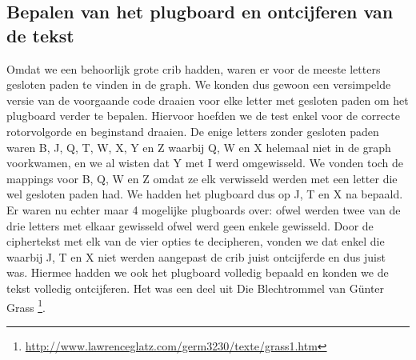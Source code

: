 \subsection{Bepalen van het plugboard en ontcijferen van de tekst}
Omdat we een behoorlijk grote crib hadden, waren er voor de meeste letters gesloten paden te vinden in de graph. We konden dus gewoon een versimpelde versie van de voorgaande code draaien voor elke letter met gesloten paden om het plugboard verder te bepalen. Hiervoor hoefden we de test enkel voor de correcte rotorvolgorde en beginstand draaien. De enige letters zonder gesloten paden waren B, J, Q, T, W, X, Y en Z waarbij Q, W en X helemaal niet in de graph voorkwamen, en we al wisten dat Y met I werd omgewisseld. We vonden toch de mappings voor B, Q, W en Z omdat ze elk verwisseld werden met een letter die wel gesloten paden had. We hadden het plugboard dus op J, T en X na bepaald. Er waren nu echter maar 4 mogelijke plugboards over: ofwel werden twee van de drie letters met elkaar gewisseld ofwel werd geen enkele gewisseld. Door de ciphertekst met elk van de vier opties te decipheren, vonden we dat enkel die waarbij J, T en X niet werden aangepast de crib juist ontcijferde en dus juist was. Hiermee hadden we ook het plugboard volledig bepaald en konden we de tekst volledig ontcijferen. Het was een deel uit Die Blechtrommel van G\"unter Grass \footnote{\url{http://www.lawrenceglatz.com/germ3230/texte/grass1.htm}}.



